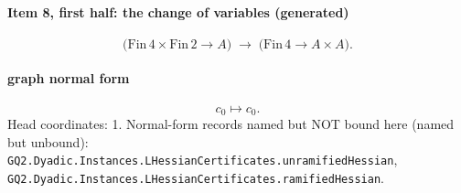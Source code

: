 \paragraph{Item 8, first half: the change of variables (generated)}
\[\bigl(\mathrm{Fin}\,4\times\mathrm{Fin}\,2\to A\bigr)\;\longrightarrow\;\bigl(\mathrm{Fin}\,4\to A\times A\bigr).\]
\paragraph{graph normal form}
\[c_0\mapsto c_0.\]
Head coordinates: 1. Normal-form records named but NOT bound here (named but unbound): \texttt{GQ2.Dyadic.Instances.LHessianCertificates.unramifiedHessian}, \texttt{GQ2.Dyadic.Instances.LHessianCertificates.ramifiedHessian}.
